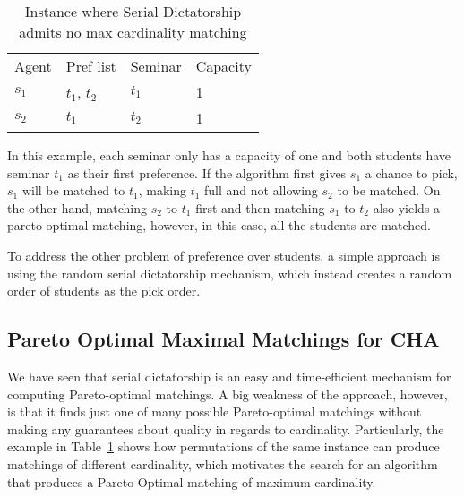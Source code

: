 \begin{table}[h!]
    \centering 
    \begin{tabular}{ll|ll}
    Agent   & Pref list     & Seminar   & Capacity \\
    $s_1$   & $t_1$, $t_2$  & $t_1$     & 1        \\
    $s_2$   & $t_1$         & $t_2$     & 1       
    \end{tabular}
    \caption{Instance where Serial Dictatorship admits no max cardinality matching}
    \label{table:1}
\end{table} 

In this example, each seminar only has a capacity of one and both students have seminar $t_1$ as their first preference. If the algorithm first gives $s_1$ a chance to pick, $s_1$ will be matched to $t_1$, making $t_1$ full and not allowing $s_2$ to be matched. On the other hand, matching $s_2$ to $t_1$ first and then matching $s_1$ to $t_2$ also yields a pareto optimal matching, however, in this case, all the students are matched.

To address the other problem of preference over students, a simple approach is using the random serial dictatorship mechanism, which instead creates a random order of students as the pick order.

\subsection{Pareto Optimal Maximal Matchings for CHA}\label{algo-max-po}
We have seen that serial dictatorship is an easy and time-efficient mechanism for computing Pareto-optimal matchings. A big weakness of the approach, however, is that it finds just one of many possible Pareto-optimal matchings without making any guarantees about quality in regards to cardinality. Particularly, the example in \mbox{Table \ref{table:1}} shows how permutations of the same instance can produce matchings of different cardinality, which motivates the search for an algorithm that produces a Pareto-Optimal matching of maximum cardinality. 

